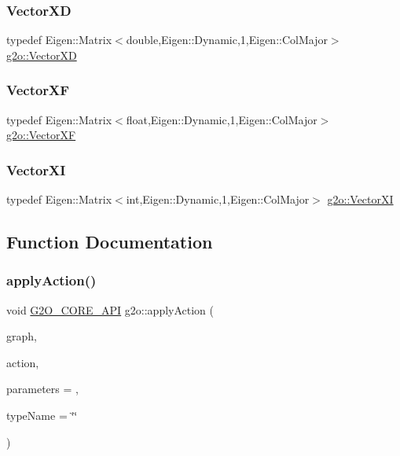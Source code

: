 \subsubsection{\texorpdfstring{Vector\+XD}{VectorXD}}
{\footnotesize\ttfamily typedef Eigen\+::\+Matrix$<$double,Eigen\+::\+Dynamic,1,Eigen\+::\+Col\+Major$>$ \mbox{\hyperlink{namespaceg2o_ab67b68e8bc395b2085174937de1a634d}{g2o\+::\+Vector\+XD}}}

\mbox{\label{namespaceg2o_a79143ea34679a74ee7ab02342b3a21df}} 
\subsubsection{\texorpdfstring{Vector\+XF}{VectorXF}}
{\footnotesize\ttfamily typedef Eigen\+::\+Matrix$<$float,Eigen\+::\+Dynamic,1,Eigen\+::\+Col\+Major$>$ \mbox{\hyperlink{namespaceg2o_a79143ea34679a74ee7ab02342b3a21df}{g2o\+::\+Vector\+XF}}}

\mbox{\label{namespaceg2o_a2797ddaf7a7a6dc22843a38d34754e55}} 
\subsubsection{\texorpdfstring{Vector\+XI}{VectorXI}}
{\footnotesize\ttfamily typedef Eigen\+::\+Matrix$<$int,Eigen\+::\+Dynamic,1,Eigen\+::\+Col\+Major$>$ \mbox{\hyperlink{namespaceg2o_a2797ddaf7a7a6dc22843a38d34754e55}{g2o\+::\+Vector\+XI}}}



\subsection{Function Documentation}
\mbox{\label{namespaceg2o_ac2ef8b73c930abdd15131f8fb02cd42f}} 
\subsubsection{\texorpdfstring{apply\+Action()}{applyAction()}}
{\footnotesize\ttfamily void \mbox{\hyperlink{g2o__core__api_8h_a7a8d7648d6f1e26632566f335751d064}{G2\+O\+\_\+\+C\+O\+R\+E\+\_\+\+A\+PI}} g2o\+::apply\+Action (\begin{DoxyParamCaption}\item[{\mbox{\hyperlink{classg2o_1_1_hyper_graph}{Hyper\+Graph}} $\ast$}]{graph,  }\item[{\mbox{\hyperlink{classg2o_1_1_hyper_graph_element_action}{Hyper\+Graph\+Element\+Action}} $\ast$}]{action,  }\item[{\mbox{\hyperlink{structg2o_1_1_hyper_graph_element_action_1_1_parameters}{Hyper\+Graph\+Element\+Action\+::\+Parameters}} $\ast$}]{parameters = {},  }\item[{const std\+::string \&}]{type\+Name = {\ttfamily \char`\"{}\char`\"{}} }\end{DoxyParamCaption})}

